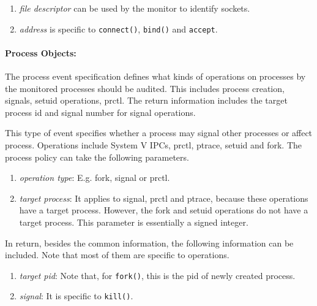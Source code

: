 \begin{enumerate}
\item {\em file descriptor} can be used by the monitor to identify sockets.
\item {\em address} is specific to {\tt connect()}, {\tt bind()} and
{\tt accept}.
\end{enumerate}

\paragraph{Process Objects:}
The process event specification defines what kinds of operations on processes
by the monitored processes should be audited. This includes process
creation, signals, setuid operations, prctl. The return information
includes the target process id and signal number for signal operations.

This type of event specifies whether a process may signal other processes
or affect process.
Operations include System V IPCs, prctl, ptrace, setuid and fork.
The process policy can take the following parameters.
\begin{enumerate}
\item {\em operation type}:
E.g. fork, signal or prctl.

\item {\em target process}:
It applies to signal, prctl and ptrace,
because these operations have a target process.
However, the fork and setuid operations do not have a target process.
This parameter is essentially a signed integer.

\end{enumerate}

In return, besides the common information,
the following information can be included.
Note that most of them are specific to operations.

\begin{enumerate}
\item {\em target pid}:
Note that, for {\tt fork()}, this is the pid of newly created process.

\item {\em signal}:
It is specific to {\tt kill()}.

\end{enumerate}

